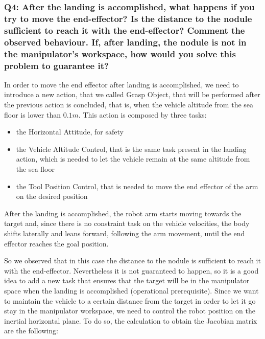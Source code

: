 \documentclass{article}
\begin{document}
\subsubsection{Q4: After the landing is accomplished, what happens if you try to move the end-effector? Is the distance to the nodule sufficient to reach it with the end-effector? Comment the observed behaviour. If, after landing, the nodule is not in the manipulator's workspace, how would you solve this problem to guarantee it?}
In order to move the end effector after landing is accomplished, we need to introduce a new action, that we called Grasp Object, that will be performed after the previous action is concluded, that is, when the vehicle altitude from the sea floor is lower than \(0.1 m\). This action is composed by three tasks: 
\begin{itemize}
	\item the Horizontal Attitude, for safety
	\item the Vehicle Altitude Control, that is the same task present in the landing action, which is needed to let the vehicle remain at the same altitude from the sea floor
	\item the Tool Position Control, that is needed to move the end effector of the arm on the desired position
\end{itemize}
After the landing is accomplished, the robot arm starts moving towards the target and, since there is no constraint task on the vehicle velocities, the body shifts laterally and leans forward, following the arm movement, until the end effector reaches the goal position.
\begin{figure}[H]
	\centering
	\hspace{10mm}
	\label{im:v_land_grasp}
\end{figure} 
So we observed that in this case the distance to the nodule is sufficient to reach it with the end-effector. Nevertheless it is not guaranteed to happen, so it is a good idea to add a new task that ensures that the target will be in the manipulator space when the landing is accomplished (operational prerequisite).
Since we want to maintain the vehicle to a certain distance from the target in order to let it go stay in the manipulator workspace, we need to control the robot position on the inertial horizontal plane. To do so, the calculation to obtain the Jacobian matrix are the following:
\end{document}
